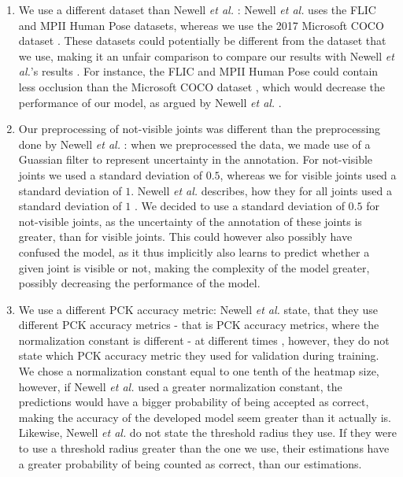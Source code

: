 \documentclass[./main.tex]{subfiles}
\begin{document}
\begin{enumerate}
    \item We use a different dataset than Newell \textit{et al.} \cite{Newell}: Newell \textit{et al.} uses the FLIC \cite{FLIC} and MPII Human Pose \cite{MPII} datasets, whereas we use the 2017 Microsoft COCO dataset \cite{COCO_article}. These datasets could potentially be different from the dataset that we use, making it an unfair comparison to compare our results with Newell \textit{et al.}'s results \cite{Newell}. For instance, the FLIC \cite{FLIC} and MPII Human Pose \cite{MPII} could contain less occlusion than the Microsoft COCO dataset \cite{COCO_article}, which would decrease the performance of our model, as argued by Newell \textit{et al.} \cite{Newell}.
    \item Our preprocessing of not-visible joints was different than the preprocessing done by Newell \textit{et al.} \cite{Newell}: when we preprocessed the data, we made use of a Guassian filter to represent uncertainty in the annotation. For not-visible joints we used a standard deviation of $0.5$, whereas we for visible joints used a standard deviation of $1$. Newell \textit{et al.} describes, how they for all joints used a standard deviation of $1$ \cite{Newell}. We decided to use a standard deviation of $0.5$ for not-visible joints, as the uncertainty of the annotation of these joints is greater, than for visible joints. This could however also possibly have confused the model, as it thus implicitly also learns to predict whether a given joint is visible or not, making the complexity of the model greater, possibly decreasing the performance of the model.
    \item We use a different PCK accuracy metric: Newell \textit{et al.} state, that they use different PCK accuracy metrics - that is PCK accuracy metrics, where the normalization constant is different - at different times \cite{Newell}, however, they do not state which PCK accuracy metric they used for validation during training. We chose a normalization constant equal to one tenth of the heatmap size, however, if Newell \textit{et al.} \cite{Newell} used a greater normalization constant, the predictions would have a bigger probability of being accepted as correct, making the accuracy of the developed model seem greater than it actually is. Likewise, Newell \textit{et al.} \cite{Newell} do not state the threshold radius they use. If they were to use a threshold radius greater than the one we use, their estimations have a greater probability of being counted as correct, than our estimations.

\end{enumerate}
\end{document}
